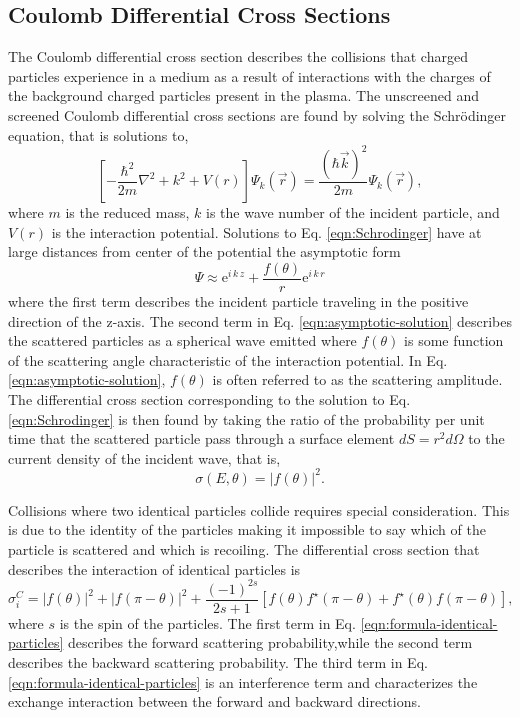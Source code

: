 \subsection{Coulomb Differential Cross Sections}
The Coulomb differential cross section describes the collisions that charged particles experience in a medium as a result of interactions with the charges of the background charged particles present in the plasma. The unscreened and screened Coulomb differential cross sections are found by solving the Schr\"{o}dinger equation, that is solutions to,
\begin{equation} \label{eqn:Schrodinger}
    \left[-\dfrac{\hbar^2}{2 m}\nabla^2 + k^2 + V(r)\right] \Psi_k(\vec{r}) = \dfrac{(\hbar \vec{k})^2}{2m} \Psi_k(\vec{r}),
\end{equation}
where $m$ is the reduced mass, $k$ is the wave number of the incident particle, and $V(r)$ is the interaction potential. Solutions to Eq. \eqref{eqn:Schrodinger} have at large distances from center of the potential the asymptotic form 
\begin{equation}  \label{eqn:asymptotic-solution}
    \Psi \approx \text{e}^{i\,k\,z} + \dfrac{f(\theta)}{r}\text{e}^{i\,k\,r}
\end{equation}
where the first term describes the incident particle traveling in the positive direction of the z-axis. The second term in Eq. \eqref{eqn:asymptotic-solution} describes the scattered particles as a spherical wave emitted where $f(\theta)$ is some function of the scattering angle characteristic of the interaction potential. In Eq. \eqref{eqn:asymptotic-solution}, $f(\theta)$ is often referred to as the scattering amplitude. The differential cross section corresponding to the solution to Eq. \eqref{eqn:Schrodinger} is then found by taking the ratio of the probability per unit time that the scattered particle pass through a surface element $dS = r^2 d\Omega$ to the current density of the incident wave, that is,
\begin{equation} \label{eqn:formula-distinguishable-particles}
    \sigma(E,\theta) = |f(\theta)|^2.
\end{equation}

Collisions where two identical particles collide requires special consideration. This is due to the identity of the particles making it impossible to say which of the particle is scattered and which is recoiling. The differential cross section that describes the interaction of identical particles is
\begin{equation} \label{eqn:formula-identical-particles}
    \sigma_{i}^{C} = | f(\theta) |^2 + | f(\pi - \theta) |^2 + \dfrac{(-1)^{2s}}{2s+1} \left[ f(\theta) f^{\star}(\pi-\theta) + f^{\star}(\theta) f(\pi-\theta) \right],
\end{equation}
where $s$ is the spin of the particles. The first term in Eq. \eqref{eqn:formula-identical-particles} describes the forward scattering probability,while the second term describes the backward scattering probability. The third term in Eq. \eqref{eqn:formula-identical-particles} is an interference term and characterizes the exchange interaction between the forward and backward directions.

